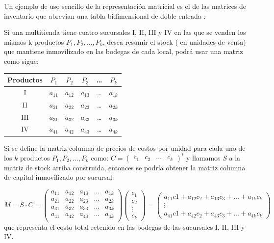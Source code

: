 \begin{ejem}
    \item Un ejemplo de uso sencillo de la representación matricial es el de las matrices de inventario que abrevian una tabla bidimensional de doble entrada :
    
Si una multitienda tiene cuatro sucursales I, II, III y IV en las que se venden los mismos k productos $P_1, P_2, \dots, P_k$, desea resumir el stock ( en unidades de venta) que mantiene inmovilizado en las bodegas de cada local, podrá usar una matriz como sigue:
\begin{center}
\begin{tabular}{|c|c|c|c|c|c|}
\hline
Productos & $P_1$ & $P_2$ & $P_3$& \dots & $P_k$\\ \hline
I & $a_{11}$& $a_{12}$ &  $a_{13}$&\dots   & $a_{1k}$\\ \hline
II &     $a_{21}$& $a_{22}$ & $a_{23}$&\dots  & $a_{2k}$\\  \hline
III &     $a_{31}$& $a_{32}$  &$a_{33}$& \dots & $a_{3k}$\\  \hline
 IV&    $a_{41}$& $a_{42}$  &$a_{43}$ &\dots & $a_{4k}$ \\ \hline
 \end{tabular}
 \end{center}
 Si se define la matriz columna de precios de costos por unidad para cada uno de los $k$
productos $P_1, P_2, \dots, P_k$ como: $C = \left(\begin{array}{ccccc}
   c_1 & c_2 &  \dots& c_k 
\end{array}\right)^t$ y llamamos $S$ a la matriz de stock arriba
construida, entonces se podría obtener la matriz columna de capital inmovilizado por
sucursal:

\[M=S\cdot C=\begin{pmatrix}
a_{11}& a_{12} &  a_{13}&\dots   & a_{1k}\\
a_{21}& a_{22} & a_{23}&\dots  & a_{2k}\\
a_{31}& a_{32}  &a_{33}& \dots & a_{3k}\\
a_{41}& a_{42} &a_{43} &\dots & a_{4k}\\
\end{pmatrix}\begin{pmatrix}
   c_1 \\ c_2 \\  \vdots\\ c_k 
\end{pmatrix}=\begin{pmatrix} a_{11}c1+ a_{12}c_2 +  a_{13}c_3 + \dots   + a_{1k}c_k \\
\vdots\\
a_{41}c1+ a_{42}c_2 +  a_{43}c_3 + \dots   + a_{4k}c_k  \end{pmatrix}\]
que representa el costo total retenido en las bodegas de las sucursales I, II, III y IV.


\end{ejem}
